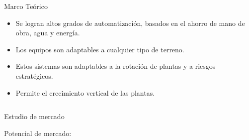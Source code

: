 \documentclass{beamer}
\begin{document}
\begin{frame}[fragile]{}
\begin{columns}[t]
\begin{column}{0.96\textwidth}
\begin{block}{Marco Teórico}
\begin{itemize}

\item Se logran altos grados de automatización, basados en el ahorro de mano de obra,
agua y energía.
\item Los equipos son adaptables a cualquier tipo de terreno.

\item Estos sistemas son adaptables a la rotación de plantas y a riesgos estratégicos.
\item Permite el crecimiento vertical de las plantas.


\end{itemize}
    \end{block}
  \end{column}
\end{columns}


\justifying
\begin{columns}[t]
	
	
	  \begin{column}{0.46\textwidth}
	  	\begin{block}{Estudio de mercado}
	  		\begin{minipage}[t]{1\linewidth}
	  			\vspace{0pt} 
Potencial de mercado:


\end{minipage}
\end{block}
\end{column}
\end{columns}
\end{frame}
\end{document}
